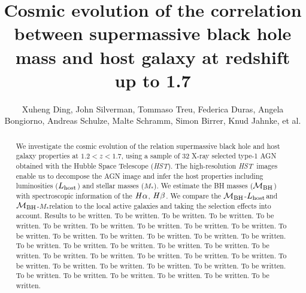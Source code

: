 \documentclass[apj]{emulateapj}
\begin{document}
\def\lcdm{$\Lambda$CDM}
\def\hst{{\it HST}}
\def\efr{$R_{\mathrm{eff}}$}
\def\galfit{\sc Galfit}
\def\mbh{$\mathcal M_{\rm BH}$}
\def\lhost{$L_{\rm host}$}
\def\jcap{Journal of Cosmology and Astroparticle Physics}
\def\halpha{${\it H}\alpha$}
\def\hbeta{${\it H}\beta$}
\def\sersic{S\'ersic}
\def\lenstronomy{{\sc Lenstronomy}}
\def\Reff{{$R_{\mathrm{eff}}$}}
\def\kms{km~s$^{\rm -1}$}
\def\sigstar{{$\sigma_*$}}
\def\smass{{$M_*$}}
\newcommand{\Mgii}{Mg$_{\rm II}$}
\newcommand{\Civ}{C$_{\rm IV}$}

\title{Cosmic evolution of the correlation between supermassive black hole mass and host galaxy at redshift up to 1.7}

\author{Xuheng Ding, John Silverman, Tommaso Treu, Federica Duras, Angela Bongiorno, Andreas Schulze, Malte Schramm, Simon Birrer, Knud Jahnke, et al.
 }



\begin{abstract}
We investigate the cosmic evolution of the relation supermassive black hole and host galaxy properties at $1.2<z<1.7$, using a sample of 32 X-ray selected type-1 AGN obtained with the Hubble Space Telescope (\hst). The high-resolution \hst\ images enable us to decompose the AGN image and infer the host properties including luminosities (\lhost) and stellar masses (\smass). We estimate the BH masses (\mbh) with spectroscopic information of the \halpha, \hbeta. We compare the \mbh-\lhost and \mbh-\smass relation to the local active galaxies and taking the selection effects into account.
Results to be written. To be written. To be written. To be written. To be written. To be written. To be written. To be written. To be written. To be written. To be written. To be written. To be written. To be written. To be written. To be written. To be written. To be written. To be written. To be written. To be written. To be written. To be written. To be written. To be written. To be written. To be written. To be written. To be written. To be written. To be written. To be written. To be written. To be written. To be written. To be written. To be written. To be written. To be written. 
\end{abstract}
\end{document}
